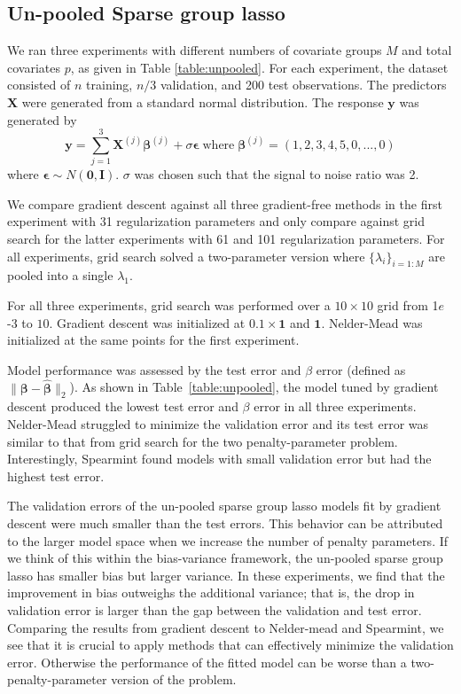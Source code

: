 \documentclass[12pt]{article}
\begin{document}
\subsection{Un-pooled Sparse group lasso}\label{sec:simulation_sgl}
We ran three experiments with different numbers of covariate groups $M$ and total covariates $p$, as given in Table \ref{table:unpooled}. For each experiment, the dataset consisted of $n$ training, $n/3$ validation, and 200 test observations. The predictors $\boldsymbol X$ were generated from a standard normal distribution. The response $\boldsymbol y$ was generated by
\begin{equation}
\boldsymbol y = \sum\limits_{j=1}^3 \boldsymbol X^{(j)} \boldsymbol \beta^{(j)} + \sigma \boldsymbol \epsilon \; \text{where} \; \boldsymbol \beta^{(j)} = (1, 2, 3, 4, 5, 0, ..., 0)
\end{equation}
where $\boldsymbol \epsilon \sim N(\boldsymbol 0, \boldsymbol I)$. $\sigma$ was chosen such that the signal to noise ratio was 2. 

We compare gradient descent against all three gradient-free methods in the first experiment with 31 regularization parameters and only compare against grid search for the latter experiments with 61 and 101 regularization parameters. For all experiments, grid search solved a two-parameter version where $\{\lambda_i\}_{i=1:M}$ are pooled into a single $\lambda_1$.

For all three experiments, grid search was performed over a $10 \times 10$ grid from 1$e$-3 to $10$. Gradient descent was initialized at $0.1 \times \boldsymbol 1$ and $\boldsymbol 1$. Nelder-Mead was initialized at the same points for the first experiment.

Model performance was assessed by the test error and $\beta$ error (defined as $\| \boldsymbol \beta - \hat {\boldsymbol \beta} \|_2$). As shown in Table~\ref{table:unpooled}, the model tuned by gradient descent produced the lowest test error and $\beta$ error in all three experiments. Nelder-Mead struggled to minimize the validation error and its test error was similar to that from grid search for the two penalty-parameter problem. Interestingly, Spearmint found models with small validation error but had the highest test error.

The validation errors of the un-pooled sparse group lasso models fit by gradient descent were much smaller than the test errors. This behavior can be attributed to the larger model space when we increase the number of penalty parameters. If we think of this within the bias-variance framework, the un-pooled sparse group lasso has smaller bias but larger variance. In these experiments, we find that the improvement in bias outweighs the additional variance; that is, the drop in validation error is larger than the gap between the validation and test error. Comparing the results from gradient descent to Nelder-mead and Spearmint, we see that it is crucial to apply methods that can effectively minimize the validation error. Otherwise the performance of the fitted model can be worse than a two-penalty-parameter version of the problem.
\end{document}
